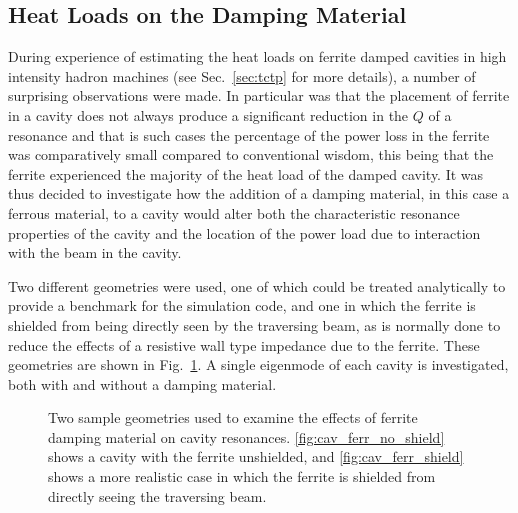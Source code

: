 \subsection{Heat Loads on the Damping Material}

During experience of estimating the heat loads on ferrite damped cavities in high intensity hadron machines (see Sec.~\ref{sec:tctp} for more details), a number of surprising observations were made. In particular was that the placement of ferrite in a cavity does not always produce a significant reduction in the $Q$ of a resonance and that is such cases the percentage of the power loss in the ferrite was comparatively small compared to conventional wisdom, this being that the ferrite experienced the majority of the heat load of the damped cavity. It was thus decided to investigate how the addition of a damping material, in this case a ferrous material, to a cavity would alter both the characteristic resonance properties of the cavity and the location of the power load due to interaction with the beam in the cavity.

Two different geometries were used, one of which could be treated analytically to provide a benchmark for the simulation code, and one in which the ferrite is shielded from being directly seen by the traversing beam, as is normally done to reduce the effects of a resistive wall type impedance due to the ferrite. These geometries are shown in Fig.~\ref{fig:ferr_cav_res}. A single eigenmode of each cavity is investigated, both with and without a damping material. 

\begin{figure}
\label{fig:ferr_cav_res}
\caption{Two sample geometries used to examine the effects of ferrite damping material on cavity resonances. \ref{fig:cav_ferr_no_shield} shows a cavity with the ferrite unshielded, and \ref{fig:cav_ferr_shield} shows a more realistic case in which the ferrite is shielded from directly seeing the traversing beam.}
\end{figure}

